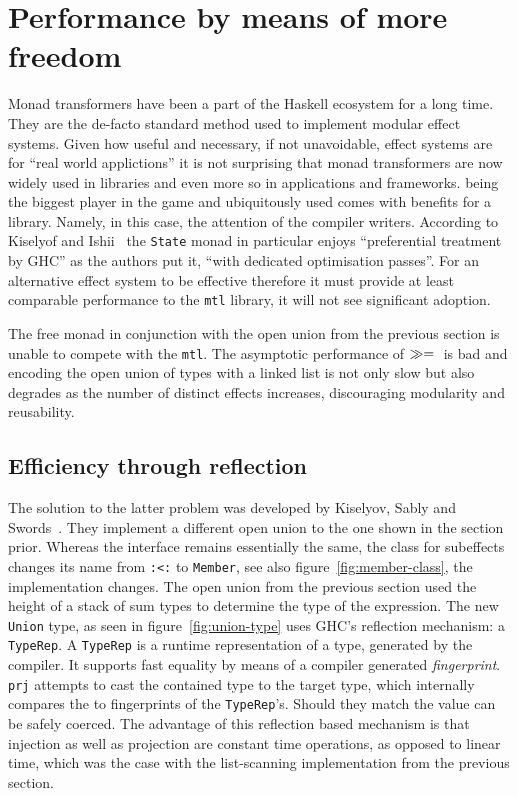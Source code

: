 \section{Performance by means of more freedom}

\label{sec:freer}

Monad transformers have been a part of the Haskell ecosystem for a long time.
They are the de-facto standard method used to implement modular effect systems.
Given how useful and necessary, if not unavoidable, effect systems are for
``real world applictions'' it is not surprising that monad transformers are now
widely used in libraries and even more so in applications and frameworks. being
the biggest player in the game and ubiquitously used comes with benefits for a
library. Namely, in this case, the attention of the compiler writers. According
to Kiselyof and Ishii~\cite{freer-monads} the \texttt{State} monad in particular
enjoys ``preferential treatment by GHC'' as the authors put it, ``with dedicated
optimisation passes''. For an alternative effect system to be effective
therefore it must provide at least comparable performance to the \texttt{mtl}
library, it will not see significant adoption.

The free monad in conjunction with the open union from the previous section is
unable to compete with the \texttt{mtl}. The asymptotic performance of
$\gg={}$ is bad and encoding the open union of types with a linked list is
not only slow but also degrades as the number of distinct effects increases,
discouraging modularity and reusability.

\subsection{Efficiency through reflection}

The solution to the latter problem was developed by Kiselyov, Sably and
Swords~\cite{extensible-effects}. They implement a different open union to the
one shown in the section prior. Whereas the interface remains essentially the
same, the class for subeffects changes its name from \texttt{:<:} to
\texttt{Member}, see also figure~\ref{fig:member-class}, the implementation
changes. The open union from the previous section used the height of a stack of
sum types to determine the type of the expression. The new \texttt{Union} type,
as seen in figure~\ref{fig:union-type} uses GHC's reflection mechanism: a
\texttt{TypeRep}. A \texttt{TypeRep} is a runtime representation of a type,
generated by the compiler. It supports fast equality by means of a compiler
generated \emph{fingerprint}. \texttt{prj} attempts to cast the contained type
to the target type, which internally compares the to fingerprints of the
\texttt{TypeRep}'s. Should they match the value can be safely coerced. The
advantage of this reflection based mechanism is that injection as well as
projection are constant time operations, as opposed to linear time, which was
the case with the list-scanning implementation from the previous section.

